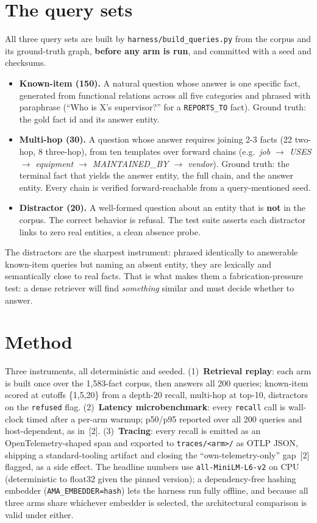 \documentclass[11pt]{article}
\begin{document}
\section{The query sets}
All three query sets are built by \texttt{harness/build\_queries.py} from the corpus and its
ground-truth graph, \textbf{before any arm is run}, and committed with a seed and checksums.
\begin{itemize}
  \item \textbf{Known-item (150).} A natural question whose answer is one specific fact,
  generated from functional relations across all five categories and phrased with paraphrase
  (``Who is X's supervisor?'' for a \texttt{REPORTS\_TO} fact). Ground truth: the gold fact
  id and its answer entity.
  \item \textbf{Multi-hop (30).} A question whose answer requires joining 2-3 facts
  (22 two-hop, 8 three-hop), from ten templates over forward chains (e.g.\ \emph{job
  $\rightarrow$ USES $\rightarrow$ equipment $\rightarrow$ MAINTAINED\_BY $\rightarrow$
  vendor}). Ground truth: the terminal fact that yields the answer entity, the full chain,
  and the answer entity. Every chain is verified forward-reachable from a query-mentioned
  seed.
  \item \textbf{Distractor (20).} A well-formed question about an entity that is
  \textbf{not} in the corpus. The correct behavior is refusal. The test suite asserts each
  distractor links to zero real entities, a clean absence probe.
\end{itemize}
The distractors are the sharpest instrument: phrased identically to answerable known-item
queries but naming an absent entity, they are lexically and semantically close to real
facts. That is what makes them a fabrication-pressure test: a dense retriever will find
\emph{something} similar and must decide whether to answer.

\section{Method}
Three instruments, all deterministic and seeded. (1)~\textbf{Retrieval replay}: each arm is
built once over the 1{,}583-fact corpus, then answers all 200 queries; known-item scored at
cutoffs \{1,5,20\} from a depth-20 recall, multi-hop at top-10, distractors on the
\texttt{refused} flag. (2)~\textbf{Latency microbenchmark}: every \texttt{recall} call is
wall-clock timed after a per-arm warmup; p50/p95 reported over all 200 queries and
host-dependent, as in~[2]. (3)~\textbf{Tracing}: every recall is emitted as an
OpenTelemetry-shaped span and exported to \texttt{traces/<arm>/} as OTLP JSON, shipping a
standard-tooling artifact and closing the ``own-telemetry-only'' gap~[2] flagged, as a side
effect. The headline numbers use \texttt{all-MiniLM-L6-v2} on CPU (deterministic to float32
given the pinned version); a dependency-free hashing embedder (\texttt{AMA\_EMBEDDER=hash})
lets the harness run fully offline, and because all three arms share whichever embedder is
selected, the architectural comparison is valid under either.
\end{document}
